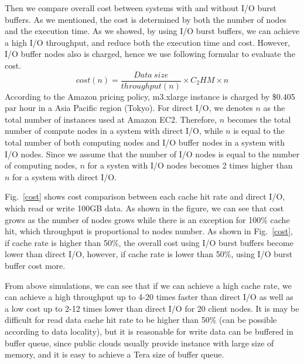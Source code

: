 Then we compare overall cost between systems with and without I/O burst buffers.
As we mentioned, the cost is  determined by both the number of nodes and the execution time. 
As we showed, by using I/O burst buffers, we can achieve a high I/O throughput, 
and reduce both the execution time and cost.
However, I/O buffer nodes also is charged, hence we use following formular to evaluate the cost.
\[cost(n)=\frac{Data~size}{throughput(n)}\times C_2HM\times n\]
According to the Amazon pricing policy, m3.xlarge instance is charged by \$0.405 par hour in a Asia Pacific region (Tokyo).
For direct I/O, we denotes $n$ as the total number of instances used at Amazon EC2. 
Therefore, $n$ becomes the total number of compute nodes in a system with direct I/O, while $n$ is equal to the total number of both computing nodes and I/O buffer nodes in a system with I/O nodes.
Since we assume that the number of I/O nodes is equal to the number of computing nodes, $n$ for a systen with I/O nodes becomes 2 times higher than $n$ for a system with direct I/O.

Fig.~\ref{cost} shows cost comparison between each cache hit rate and direct I/O, which read or write 100GB data.
As shown in the figure,  we can see that cost grows as the number of nodes grows while there is an exception for 100\% cache hit, which throughput is proportional to nodes number.
As shown in Fig.~\ref{cost}, if cache rate is higher than 50\%, the overall cost using I/O burst buffers become lower than direct I/O, however, if cache rate is lower than 50\%, using I/O burst buffer cost more.

From above simulations, we can see that if we can achieve a high cache rate, we can achieve a high throughput up to 4-20 times faster than direct I/O as well as a low cost up to 2-12 times lower than direct I/O for 20 client nodes.
It is may be difficult for read data cache hit rate to be higher than 50\% (can be possible according to data locality), but it is reasonable for write data can be buffered in buffer queue, since public clouds usually provide instance with large size of memory, and it is easy to achieve a Tera size of buffer queue.
